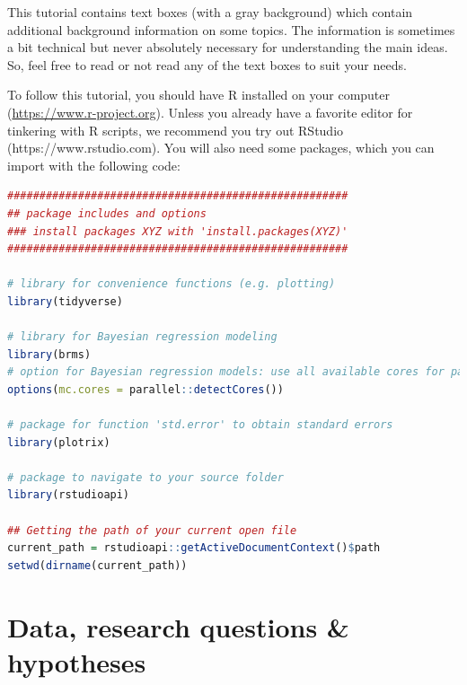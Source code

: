 \documentclass[nobib]{tufte-handout}
\begin{document}
This tutorial contains text boxes (with a gray background) which contain additional background
information on some topics. The information is sometimes a bit technical but never absolutely
necessary for understanding the main ideas. So, feel free to read or not read any of the text
boxes to suit your needs.

To follow this tutorial, you should have R installed on your computer
(\url{https://www.r-project.org}). Unless you already have a favorite editor for tinkering with
R scripts, we recommend you try out RStudio (https://www.rstudio.com). You will also need some
packages, which you can import with the following
code:

\begin{minipage}[]{\textwidth}
\begin{lstlisting}[language=R]
#####################################################
## package includes and options
### install packages XYZ with 'install.packages(XYZ)'
#####################################################

# library for convenience functions (e.g. plotting)
library(tidyverse)

# library for Bayesian regression modeling
library(brms)
# option for Bayesian regression models: use all available cores for parallel computing
options(mc.cores = parallel::detectCores())

# package for function 'std.error' to obtain standard errors
library(plotrix)

# package to navigate to your source folder
library(rstudioapi)

## Getting the path of your current open file
current_path = rstudioapi::getActiveDocumentContext()$path 
setwd(dirname(current_path))
\end{lstlisting}
\end{minipage}





\section{Data, research questions \& hypotheses}
\label{sec:data}
\end{document}
